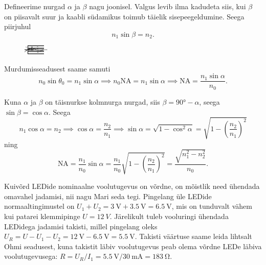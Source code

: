 \documentclass[10pt]{article}
\begin{document}

\solu
Defineerime nurgad $\alpha$ ja $\beta$ nagu joonisel. Valgus levib ilma kadudeta siis, kui $\beta$ on piisavalt suur ja kaabli südamikus toimub täielik sisepeegeldumine. Seega piirjuhul
\begin{equation*}
    n_1 \sin \beta = n_2.
\end{equation*}

\begin{figure}[h]
    \centering
    \includegraphics[width=.7\linewidth]{2024-lahg-03-yl.pdf}
\end{figure}

Murdumisseadusest saame samuti
\begin{equation*}
    n_0 \sin \theta_0 = n_1 \sin \alpha \implies n_0 \text{NA} = n_1 \sin \alpha \implies \text{NA} = \frac{n_1 \sin \alpha}{n_0}.
\end{equation*}

Kuna $\alpha$ ja $\beta$ on täisnurkse kolmnurga nurgad, siis $\beta = \ang{90} - \alpha$, seega $\sin \beta = \cos \alpha$. Seega
\begin{equation*}
    n_1 \cos\alpha = n_2 \implies \cos \alpha = \frac{n_2}{n_1} \implies \sin\alpha = \sqrt{1-\cos^2\alpha} = \sqrt{1-\left(\frac{n_2}{n_1}\right)^2}
\end{equation*}
ning
\begin{equation*}
    \text{NA} = \frac{n_1}{n_0}\sin\alpha = \frac{n_1}{n_0}\sqrt{1-\left(\frac{n_2}{n_1}\right)^2} = \frac{\sqrt{n_1^2-n_2^2}}{n_0}.
\end{equation*}
\probend
\bigskip


\solu
Kuivõrd LEDide nominaalne voolutugevus on võrdne, on mõistlik need ühendada omavahel jadamisi, nii nagu Mari seda tegi. Pingelang üle LEDide normaaltingimustel on $U_1+U_2=\SI{3}{\V}+\SI{3.5}{\V}=\SI{6.5}{\V}$, mis on tunduvalt vähem kui patarei klemmipinge $U=\SI{12}{V}$. Järelikult tuleb vooluringi ühendada LEDidega jadamisi takisti, millel pingelang oleks $U_R=U-U_1-U_2=\SI{12}{\V}-\SI{6.5}{\V}=\SI{5.5}{\V}$. Takisti väärtuse saame leida lihtsalt Ohmi seadusest, kuna takistit läbiv voolutugevus peab olema võrdne LEDe läbiva voolutugevusega: $R=U_R/I_1=\SI{5.5}{\V}/\SI{30}{\milli\A}=\SI{183}{\ohm}$.
\end{document}
